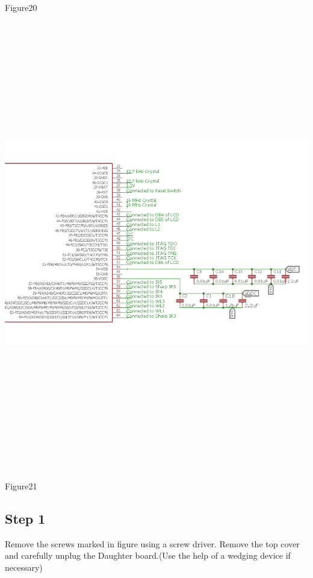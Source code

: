\documentclass[a4paper,12pt,oneside]{book}
\begin{document}
\begin{itemize}
			\hspace{6 cm}
			Figure20\\
			\includegraphics[width=15cm, height=20cm]{Images/uC2}
			
			\hspace{6 cm}
			Figure21
	\end{itemize}
\subsection*{Step 1}
Remove the screws marked in figure using a screw driver. Remove the top cover and carefully unplug the Daughter board.(Use the help of a wedging device if necessary)
\end{document}
